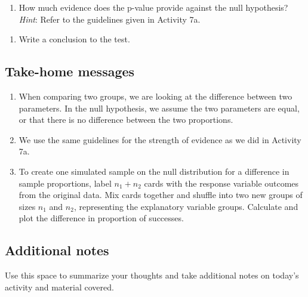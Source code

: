 \documentclass[
]{report}
\providecommand{\tightlist}{%
  \setlength{\itemsep}{0pt}\setlength{\parskip}{0pt}}
\begin{document}
\vspace{1in}

\begin{enumerate}
\def\labelenumi{\arabic{enumi}.}
\setcounter{enumi}{20}
\tightlist
\item
  How much evidence does the p-value provide against the null hypothesis? \emph{Hint}: Refer to the guidelines given in Activity 7a.
\end{enumerate}

\vspace{0.4in}

\begin{enumerate}
\def\labelenumi{\arabic{enumi}.}
\setcounter{enumi}{21}
\tightlist
\item
  Write a conclusion to the test.
\end{enumerate}

\vspace{1in}

\hypertarget{take-home-messages-14}{%
\subsection{Take-home messages}\label{take-home-messages-14}}

\begin{enumerate}
\def\labelenumi{\arabic{enumi}.}
\item
  When comparing two groups, we are looking at the difference between two parameters. In the null hypothesis, we assume the two parameters are equal, or that there is no difference between the two proportions.
\item
  We use the same guidelines for the strength of evidence as we did in Activity 7a.
\item
  To create one simulated sample on the null distribution for a difference in sample proportions, label \(n_1 + n_2\) cards with the response variable outcomes from the original data. Mix cards together and shuffle into two new groups of sizes \(n_1\) and \(n_2\), representing the explanatory variable groups. Calculate and plot the difference in proportion of successes.
\end{enumerate}

\hypertarget{additional-notes-14}{%
\subsection{Additional notes}\label{additional-notes-14}}

Use this space to summarize your thoughts and take additional notes on today's activity and material covered.
\end{document}
